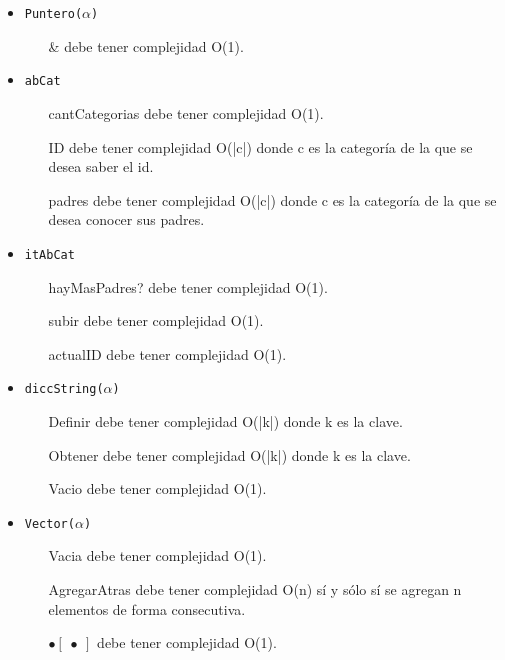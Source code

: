 \documentclass[10pt, a4paper]{article}
\let\TipoVariable=\texttt
\begin{document}
\begin{itemize}
	\item \TipoVariable{Puntero($\alpha$)}
	\begin{itemize}
		\item[\&] debe tener complejidad O(1).
	\end{itemize}

	\item \TipoVariable{abCat}
	\begin{itemize}
		\item[cantCategorias] debe tener complejidad O(1).
		\item[ID] debe tener complejidad O(|c|) donde c es la categor\'ia de la que se desea saber el id.
		\item[padres] debe tener complejidad O(|c|) donde c es la categor\'ia de la que se desea conocer sus padres.
	\end{itemize}

	\item \TipoVariable{itAbCat}
	\begin{itemize}
		\item[hayMasPadres?] debe tener complejidad O(1).
		\item[subir] debe tener complejidad O(1).
		\item[actualID] debe tener complejidad O(1).
	\end{itemize}

	\item \TipoVariable{diccString($\alpha$)}
	\begin{itemize}
		\item[Definir] debe tener complejidad O(|k|) donde k es la clave.
		\item[Obtener] debe tener complejidad O(|k|) donde k es la clave.
		\item[Vacio] debe tener complejidad O(1).
	\end{itemize}

	\item \TipoVariable{Vector($\alpha$)}
	\begin{itemize}
		\item[Vacia] debe tener complejidad O(1).
		\item[AgregarAtras] debe tener complejidad O(n) s\'i y s\'olo s\'i se agregan n elementos de forma consecutiva.
		\item[$\bullet\begin{bmatrix}\bullet\end{bmatrix}$] debe tener complejidad O(1).
	\end{itemize}


\end{itemize}
\end{document}
